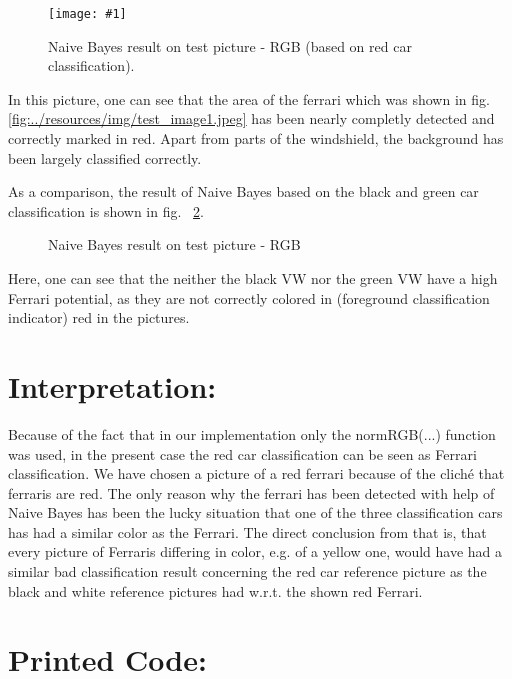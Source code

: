 \documentclass[a4paper,headings=small]{scrartcl}
\numberwithin{equation}{section} %
\numberwithin{figure}{section}   %
\newcommand{\image}[3]{
	\begin{figure}[htbp]
		\centering
		\texttt{[image: \#1]}
		\caption{#3}
		\label{fig:#1}
	\end{figure}
}
\newcommand{\imgRoot}{../resources/img}
\newcommand{\imgGeneratedRoot}{../../../target}
\begin{document}
\image{\imgGeneratedRoot/1rot_result_ml.png}{0.8}{%
		Naive Bayes result on test picture - RGB (based on red car classification).}

In this picture, one can see that the area of the ferrari
which was shown in fig. \ref{fig:\imgRoot/test_image1.jpeg}
has been nearly completly detected and correctly marked in red.
Apart from parts of the windshield, the background has been largely classified correctly.

As a comparison, the result of Naive Bayes based on the black and green car classification
is shown in fig. ~\ref{fig:label4}.

\begin{figure}
 \hfill
{}
\caption{Naive Bayes result on test picture - RGB}
\label{fig:label4}
\end{figure}

Here, one can see that the neither the black VW nor the green VW have a high Ferrari potential,
as they are not correctly colored in (foreground classification indicator) red in the pictures.

\section{Interpretation:}

Because of the fact that in our implementation only the normRGB(...) function was used,
in the present case the red car classification can be seen as Ferrari classification.
We have chosen a picture of a red ferrari because of the cliché that ferraris are red.
The only reason why the ferrari has been detected with help of Naive Bayes
has been the lucky situation that one of the three classification cars has had
a similar color as the Ferrari.
The direct conclusion from that is, that every picture of Ferraris differing in color, e.g. of a yellow one, would have had a similar bad
classification result concerning the red car reference picture as the black and white reference pictures had w.r.t. the shown red Ferrari.

\newpage
\section{Printed Code:}


\end{document}
